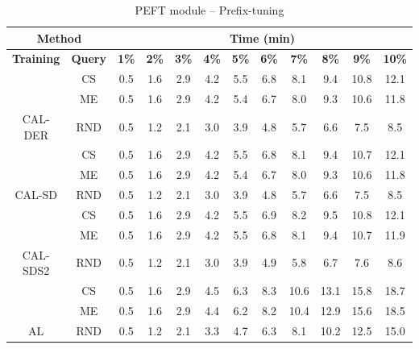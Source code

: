 \begin{table}[htbp]
\begin{subtable}{\linewidth}
\begin{tabular}{c|c|cccccccccc}
\toprule
\multicolumn{2}{c|}{\textbf{Method}} & \multicolumn{10}{c}{\textbf{Time (min)}} \\
\midrule
\textbf{Training} & \textbf{Query} & \textbf{1\%} & \textbf{2\%} & \textbf{3\%} & \textbf{4\%} & \textbf{5\%} & \textbf{6\%} & \textbf{7\%} & \textbf{8\%} & \textbf{9\%} & \textbf{10\%}\\
\midrule
 & CS & 0.5 & 1.6 & 2.9 & 4.2 & 5.5 & 6.8 & 8.1 & 9.4 & 10.8 & 12.1\\

 & ME & 0.5 & 1.6 & 2.9 & 4.2 & 5.4 & 6.7 & 8.0 & 9.3 & 10.6 & 11.8\\

\multirow{-3}{*}{\raggedright\arraybackslash CAL-DER} & RND & 0.5 & 1.2 & 2.1 & 3.0 & 3.9 & 4.8 & 5.7 & 6.6 & 7.5 & 8.5\\
\midrule
 & CS & 0.5 & 1.6 & 2.9 & 4.2 & 5.5 & 6.8 & 8.1 & 9.4 & 10.7 & 12.1\\

 & ME & 0.5 & 1.6 & 2.9 & 4.2 & 5.4 & 6.7 & 8.0 & 9.3 & 10.6 & 11.8\\

\multirow{-3}{*}{\raggedright\arraybackslash CAL-SD} & RND & 0.5 & 1.2 & 2.1 & 3.0 & 3.9 & 4.8 & 5.7 & 6.6 & 7.5 & 8.5\\
\midrule
 & CS & 0.5 & 1.6 & 2.9 & 4.2 & 5.5 & 6.9 & 8.2 & 9.5 & 10.8 & 12.1\\

 & ME & 0.5 & 1.6 & 2.9 & 4.2 & 5.5 & 6.8 & 8.1 & 9.4 & 10.7 & 11.9\\

\multirow{-3}{*}{\raggedright\arraybackslash CAL-SDS2} & RND & 0.5 & 1.2 & 2.1 & 3.0 & 3.9 & 4.9 & 5.8 & 6.7 & 7.6 & 8.6\\
\midrule
 & CS & 0.5 & 1.6 & 2.9 & 4.5 & 6.3 & 8.3 & 10.6 & 13.1 & 15.8 & 18.7\\

 & ME & 0.5 & 1.6 & 2.9 & 4.4 & 6.2 & 8.2 & 10.4 & 12.9 & 15.6 & 18.5\\

\multirow{-3}{*}{\raggedright\arraybackslash AL} & RND & 0.5 & 1.2 & 2.1 & 3.3 & 4.7 & 6.3 & 8.1 & 10.2 & 12.5 & 15.0\\
\bottomrule
\end{tabular}
\end{subtable}
\vspace{1em}
\begin{subtable}{\linewidth}
\centering
\caption{PEFT module -- Prefix-tuning}


\end{subtable}
\end{table}
